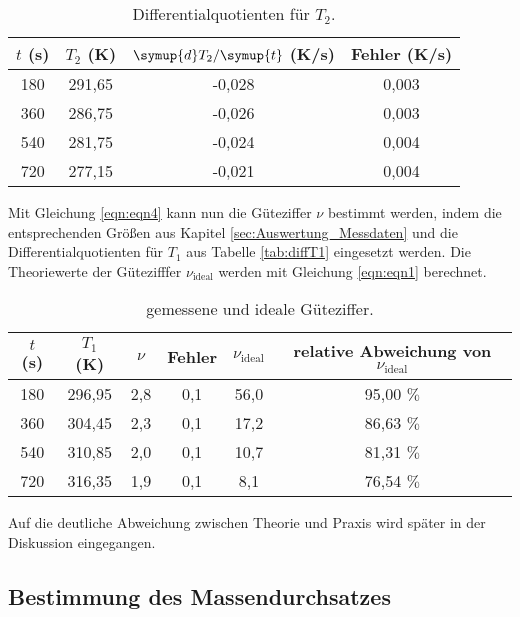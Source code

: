 \begin{table}
  \centering
  \caption{Differentialquotienten für $T_2$.}
  \label{tab:diffT2}
  \begin{tabular}{c c c c}
    \toprule
    $t$ (s) & $T_2$ (K) & $\symup{d}T_2/\symup{t}$ (K/s) & Fehler (K/s) \\
    \midrule
    180 & 291,65 & -0,028 & 0,003 \\
    360 & 286,75 & -0,026 & 0,003 \\
    540 & 281,75 & -0,024 & 0,004 \\
    720 & 277,15 & -0,021 & 0,004 \\
    \bottomrule
  \end{tabular}
\end{table}
\FloatBarrier
Mit Gleichung \eqref{eqn:eqn4} kann nun die Güteziffer $\nu$ bestimmt werden, indem die entsprechenden Größen aus Kapitel \ref{sec:Auswertung_Messdaten} und die Differentialquotienten für $T_1$ aus Tabelle \ref{tab:diffT1} eingesetzt werden.
Die Theoriewerte der Gütezifffer $\nu_{\text{ideal}}$ werden mit Gleichung \eqref{eqn:eqn1} berechnet.
\begin{table}
  \centering
  \caption{gemessene und ideale Güteziffer.}
  \label{tab:guete}
  \begin{tabular}{c c c c c c}
    \toprule
    $t$ (s) & $T_1$ (K) & $\nu$ & Fehler & $\nu_{\text{ideal}}$ & relative Abweichung von $\nu_{\text{ideal}}$ \\
    \midrule
    180 & 296,95 & 2,8 & 0,1 & 56,0 & 95,00 $\%$ \\
    360 & 304,45 & 2,3 & 0,1 & 17,2 & 86,63 $\%$ \\
    540 & 310,85 & 2,0 & 0,1 & 10,7 & 81,31 $\%$ \\
    720 & 316,35 & 1,9 & 0,1 &  8,1 & 76,54 $\%$ \\
    \bottomrule
  \end{tabular}
\end{table}
Auf die deutliche Abweichung zwischen Theorie und Praxis wird später in der Diskussion eingegangen.
\FloatBarrier

\subsection{Bestimmung des Massendurchsatzes}
\label{sec:Auswertung_Massendurchsatz}

